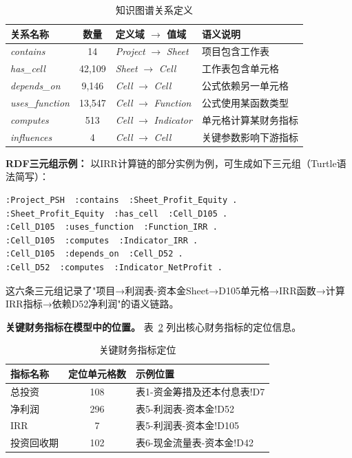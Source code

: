 \begin{table}[H]
	\centering
	\caption{知识图谱关系定义}
	\label{tab:kg_relations}
	\vspace {-2.5mm}
	\begin{center}
		\begin{tabular}{lcll}
			\toprule
			关系名称 & 数量 & 定义域 $\to$ 值域 & 语义说明 \\
			\hline
			\textit{contains} & 14 & \textit{Project} $\to$ \textit{Sheet} & 项目包含工作表 \\
			\textit{has\_cell} & 42,109 & \textit{Sheet} $\to$ \textit{Cell} & 工作表包含单元格 \\
			\textit{depends\_on} & 9,146 & \textit{Cell} $\to$ \textit{Cell} & 公式依赖另一单元格 \\
			\textit{uses\_function} & 13,547 & \textit{Cell} $\to$ \textit{Function} & 公式使用某函数类型 \\
			\textit{computes} & 513 & \textit{Cell} $\to$ \textit{Indicator} & 单元格计算某财务指标 \\
			\textit{influences} & 4 & \textit{Cell} $\to$ \textit{Cell} & 关键参数影响下游指标 \\
			\bottomrule
		\end{tabular}
	\end{center}
\end{table}

\textbf{RDF三元组示例：} 以IRR计算链的部分实例为例，可生成如下三元组（Turtle语法简写）：

\begin{verbatim}
:Project_PSH  :contains  :Sheet_Profit_Equity .
:Sheet_Profit_Equity  :has_cell  :Cell_D105 .
:Cell_D105  :uses_function  :Function_IRR .
:Cell_D105  :computes  :Indicator_IRR .
:Cell_D105  :depends_on  :Cell_D52 .
:Cell_D52  :computes  :Indicator_NetProfit .
\end{verbatim}

这六条三元组记录了"项目→利润表-资本金Sheet→D105单元格→IRR函数→计算IRR指标→依赖D52净利润"的语义链路。

\textbf{关键财务指标在模型中的位置。} 表~\ref{tab:indicator_locs} 列出核心财务指标的定位信息。

\begin{table}[H]
	\centering
	\caption{关键财务指标定位}
	\label{tab:indicator_locs}
	\vspace {-2.5mm}
	\begin{center}
		\begin{tabular}{lcl}
			\toprule
			指标名称 & 定位单元格数 & 示例位置 \\
			\hline
			总投资 & 108 & 表1-资金筹措及还本付息表!D7 \\
			净利润 & 296 & 表5-利润表-资本金!D52 \\
			IRR & 7 & 表5-利润表-资本金!D105 \\
			投资回收期 & 102 & 表6-现金流量表-资本金!D42 \\
			\bottomrule
		\end{tabular}
	\end{center}
\end{table}

